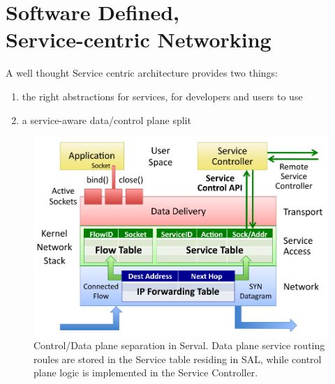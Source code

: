 \newpage
\section{Software Defined,\\ Service-centric Networking}
A well thought Service centric architecture provides two things:
\begin{enumerate} \itemsep1pt \parskip0pt 
  \item the right abstractions for services, for developers and users to use
  \item a service-aware data/control plane split
\end{enumerate}

\begin{figure}[H]
\centering
{}
\includegraphics[scale=0.3]{figures/SAL_plane_split}
\caption[Control/Data plane separation in Serval]{Control/Data plane separation in Serval. Data plane service routing roules are stored in the Service table residing in SAL, while control plane logic is implemented in the Service Controller.}
\label{fig:sal_plane_split}
\end{figure}

